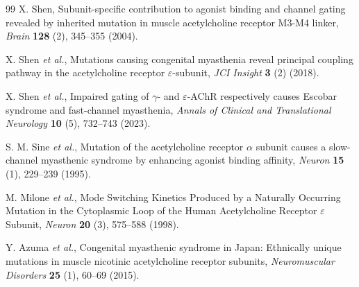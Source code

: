 \documentclass{ws-procs11x85}
\begin{document}
\begin{thebibliography}{99}
X. Shen, Subunit-specific contribution to agonist binding and channel gating revealed by inherited mutation in muscle acetylcholine receptor M3-M4 linker, {\em Brain} {\bf 128} (2), 345--355 (2004).

X. Shen {\em et al.}, Mutations causing congenital myasthenia reveal principal coupling pathway in the acetylcholine receptor $\varepsilon$-subunit, {\em JCI Insight} {\bf 3} (2) (2018).

X. Shen {\em et al.}, Impaired gating of $\gamma$- and $\varepsilon$-AChR respectively causes Escobar syndrome and fast-channel myasthenia, {\em Annals of Clinical and Translational Neurology} {\bf 10} (5), 732--743 (2023).

S. M. Sine {\em et al.}, Mutation of the acetylcholine receptor $\alpha$ subunit causes a slow-channel myasthenic syndrome by enhancing agonist binding affinity, {\em Neuron} {\bf 15} (1), 229--239 (1995).

M. Milone {\em et al.}, Mode Switching Kinetics Produced by a Naturally Occurring Mutation in the Cytoplasmic Loop of the Human Acetylcholine Receptor $\varepsilon$ Subunit, {\em Neuron} {\bf 20} (3), 575--588 (1998).

Y. Azuma {\em et al.}, Congenital myasthenic syndrome in Japan: Ethnically unique mutations in muscle nicotinic acetylcholine receptor subunits, {\em Neuromuscular Disorders} {\bf 25} (1), 60--69 (2015).

\end{thebibliography}
\end{document}
